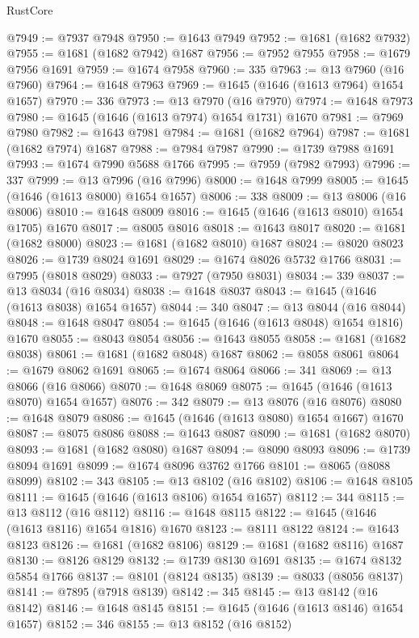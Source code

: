 \begin{lexlean}{RustCore}
\begin{coremodule}
@7949 := @7937 @7948
@7950 := @1643 @7949
@7952 := @1681 (@1682 @7932)
@7955 := @1681 (@1682 @7942) @1687
@7956 := @7952 @7955
@7958 := @1679 @7956 @1691
@7959 := @1674 @7958
@7960 := 335
@7963 := @13 @7960 (@16 @7960)
@7964 := @1648 @7963
@7969 := @1645 (@1646 (@1613 @7964) @1654 @1657)
@7970 := 336
@7973 := @13 @7970 (@16 @7970)
@7974 := @1648 @7973
@7980 := @1645 (@1646 (@1613 @7974) @1654 @1731) @1670
@7981 := @7969 @7980
@7982 := @1643 @7981
@7984 := @1681 (@1682 @7964)
@7987 := @1681 (@1682 @7974) @1687
@7988 := @7984 @7987
@7990 := @1739 @7988 @1691
@7993 := @1674 @7990 @5688 @1766
@7995 := @7959 (@7982 @7993)
@7996 := 337
@7999 := @13 @7996 (@16 @7996)
@8000 := @1648 @7999
@8005 := @1645 (@1646 (@1613 @8000) @1654 @1657)
@8006 := 338
@8009 := @13 @8006 (@16 @8006)
@8010 := @1648 @8009
@8016 := @1645 (@1646 (@1613 @8010) @1654 @1705) @1670
@8017 := @8005 @8016
@8018 := @1643 @8017
@8020 := @1681 (@1682 @8000)
@8023 := @1681 (@1682 @8010) @1687
@8024 := @8020 @8023
@8026 := @1739 @8024 @1691
@8029 := @1674 @8026 @5732 @1766
@8031 := @7995 (@8018 @8029)
@8033 := @7927 (@7950 @8031)
@8034 := 339
@8037 := @13 @8034 (@16 @8034)
@8038 := @1648 @8037
@8043 := @1645 (@1646 (@1613 @8038) @1654 @1657)
@8044 := 340
@8047 := @13 @8044 (@16 @8044)
@8048 := @1648 @8047
@8054 := @1645 (@1646 (@1613 @8048) @1654 @1816) @1670
@8055 := @8043 @8054
@8056 := @1643 @8055
@8058 := @1681 (@1682 @8038)
@8061 := @1681 (@1682 @8048) @1687
@8062 := @8058 @8061
@8064 := @1679 @8062 @1691
@8065 := @1674 @8064
@8066 := 341
@8069 := @13 @8066 (@16 @8066)
@8070 := @1648 @8069
@8075 := @1645 (@1646 (@1613 @8070) @1654 @1657)
@8076 := 342
@8079 := @13 @8076 (@16 @8076)
@8080 := @1648 @8079
@8086 := @1645 (@1646 (@1613 @8080) @1654 @1667) @1670
@8087 := @8075 @8086
@8088 := @1643 @8087
@8090 := @1681 (@1682 @8070)
@8093 := @1681 (@1682 @8080) @1687
@8094 := @8090 @8093
@8096 := @1739 @8094 @1691
@8099 := @1674 @8096 @3762 @1766
@8101 := @8065 (@8088 @8099)
@8102 := 343
@8105 := @13 @8102 (@16 @8102)
@8106 := @1648 @8105
@8111 := @1645 (@1646 (@1613 @8106) @1654 @1657)
@8112 := 344
@8115 := @13 @8112 (@16 @8112)
@8116 := @1648 @8115
@8122 := @1645 (@1646 (@1613 @8116) @1654 @1816) @1670
@8123 := @8111 @8122
@8124 := @1643 @8123
@8126 := @1681 (@1682 @8106)
@8129 := @1681 (@1682 @8116) @1687
@8130 := @8126 @8129
@8132 := @1739 @8130 @1691
@8135 := @1674 @8132 @5854 @1766
@8137 := @8101 (@8124 @8135)
@8139 := @8033 (@8056 @8137)
@8141 := @7895 (@7918 @8139)
@8142 := 345
@8145 := @13 @8142 (@16 @8142)
@8146 := @1648 @8145
@8151 := @1645 (@1646 (@1613 @8146) @1654 @1657)
@8152 := 346
@8155 := @13 @8152 (@16 @8152)

\end{coremodule}
\end{lexlean}

